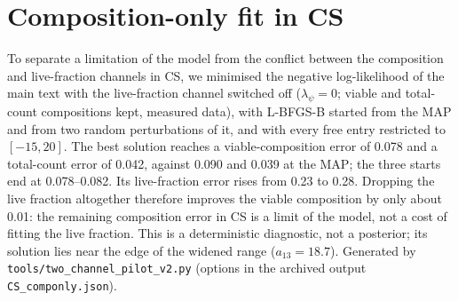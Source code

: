 \documentclass[11pt,a4paper]{article}
\begin{document}
\section{Composition-only fit in CS}
\label{sec:S_ceiling}
To separate a limitation of the model from the conflict between the composition and live-fraction channels in CS, we minimised the negative log-likelihood of the main text with the live-fraction channel switched off ($\lambda_\psi=0$; viable and total-count compositions kept, measured data), with L-BFGS-B started from the MAP and from two random perturbations of it, and with every free entry restricted to $[-15,20]$.
The best solution reaches a viable-composition error of 0.078 and a total-count error of 0.042, against 0.090 and 0.039 at the MAP; the three starts end at 0.078--0.082.
Its live-fraction error rises from 0.23 to 0.28.
Dropping the live fraction altogether therefore improves the viable composition by only about 0.01: the remaining composition error in CS is a limit of the model, not a cost of fitting the live fraction.
This is a deterministic diagnostic, not a posterior; its solution lies near the edge of the widened range ($a_{13}=18.7$). Generated by \texttt{tools/two\_channel\_pilot\_v2.py} (options in the archived output \texttt{CS\_componly.json}).
\end{document}
